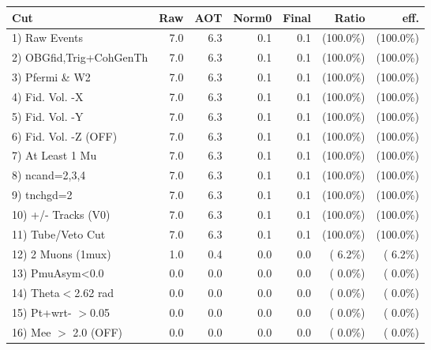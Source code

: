  \begin{table}[h!]\centering
 \begin{tabular}{||l||r|r|r|r|r|r||}
 \hline
 \hline
 Cut & Raw & AOT & Norm0 & Final & Ratio & eff.       \\
 \hline
  1) Raw Events           &          7.0 &          6.3 &          0.1 &          0.1 & (100.0\%) & (100.0\%) \\
  2) OBGfid,Trig+CohGenTh &          7.0 &          6.3 &          0.1 &          0.1 & (100.0\%) & (100.0\%) \\
  3) Pfermi \& W2         &          7.0 &          6.3 &          0.1 &          0.1 & (100.0\%) & (100.0\%) \\
  4) Fid. Vol. -X         &          7.0 &          6.3 &          0.1 &          0.1 & (100.0\%) & (100.0\%) \\
  5) Fid. Vol. -Y         &          7.0 &          6.3 &          0.1 &          0.1 & (100.0\%) & (100.0\%) \\
  6) Fid. Vol. -Z (OFF)   &          7.0 &          6.3 &          0.1 &          0.1 & (100.0\%) & (100.0\%) \\
  7) At Least 1 Mu        &          7.0 &          6.3 &          0.1 &          0.1 & (100.0\%) & (100.0\%) \\
  8) ncand=2,3,4          &          7.0 &          6.3 &          0.1 &          0.1 & (100.0\%) & (100.0\%) \\
  9) tnchgd=2             &          7.0 &          6.3 &          0.1 &          0.1 & (100.0\%) & (100.0\%) \\
 10) +/- Tracks (V0)      &          7.0 &          6.3 &          0.1 &          0.1 & (100.0\%) & (100.0\%) \\
 11) Tube/Veto Cut        &          7.0 &          6.3 &          0.1 &          0.1 & (100.0\%) & (100.0\%) \\
 12) 2 Muons (1mux)       &          1.0 &          0.4 &          0.0 &          0.0 & (  6.2\%) & (  6.2\%) \\
 13) PmuAsym<0.0          &          0.0 &          0.0 &          0.0 &          0.0 & (  0.0\%) & (  0.0\%) \\
 14) Theta$<$2.62 rad     &          0.0 &          0.0 &          0.0 &          0.0 & (  0.0\%) & (  0.0\%) \\
 15) Pt+wrt- $>$0.05      &          0.0 &          0.0 &          0.0 &          0.0 & (  0.0\%) & (  0.0\%) \\
 16) Mee $>$ 2.0  (OFF)   &          0.0 &          0.0 &          0.0 &          0.0 & (  0.0\%) & (  0.0\%) \\

\end{tabular}
\end{table}
